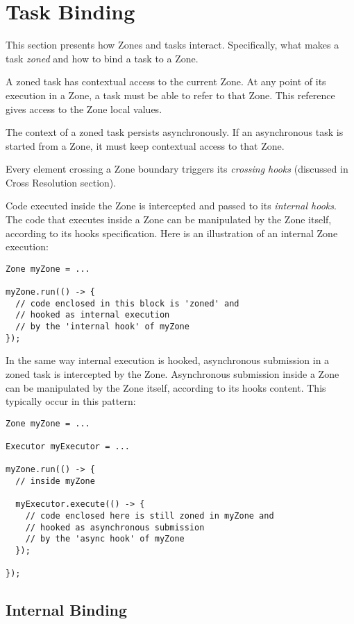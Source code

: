 \section{Task Binding}

This section presents how Zones and tasks interact. Specifically, what makes a task \emph{zoned} and how to bind a task to a Zone.

A zoned task has contextual access to the current Zone. At any point of its execution in a Zone, a task must be able to refer to that Zone. This reference gives access to the Zone local values.

The context of a zoned task persists asynchronously. If an asynchronous task is started from a Zone, it must keep contextual access to that Zone.

Every element crossing a Zone boundary triggers its \emph{crossing hooks} (discussed in Cross Resolution section).

Code executed inside the Zone is intercepted and passed to its \emph{internal hooks}. The code that executes inside a Zone can be manipulated by the Zone itself, according to its hooks specification. Here is an illustration of an internal Zone execution:

\begin{lstlisting}
Zone myZone = ...

myZone.run(() -> {
  // code enclosed in this block is 'zoned' and
  // hooked as internal execution
  // by the 'internal hook' of myZone
});
\end{lstlisting}

In the same way internal execution is hooked, asynchronous submission in a zoned task is intercepted by the Zone.
Asynchronous submission inside a Zone can be manipulated by the Zone itself, according to its hooks content. This typically occur in this pattern:

\begin{lstlisting}
Zone myZone = ...

Executor myExecutor = ...

myZone.run(() -> {
  // inside myZone

  myExecutor.execute(() -> {
    // code enclosed here is still zoned in myZone and
    // hooked as asynchronous submission
    // by the 'async hook' of myZone
  });
  
});
\end{lstlisting}

\subsection*{Internal Binding}

